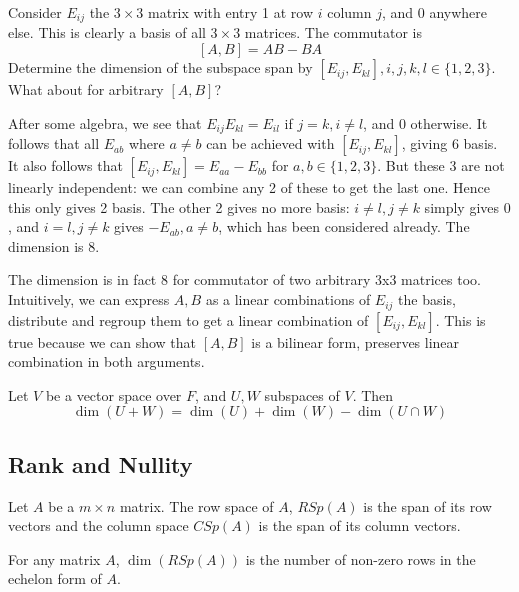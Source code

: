 \documentclass[11pt]{article}
\begin{document}
\begin{exercise}
  Consider \(E_{ij}\) the \(3\times 3\) matrix with entry 1 at row \(i\) column \(j\), and 0 anywhere else. This is clearly a basis of all \(3\times 3\) matrices. The commutator is
  \[[A,B]=AB-BA\]
  Determine the dimension of the subspace span by \([E_{ij},E_{kl}],i,j,k,l\in\{1,2,3\}\). What about for arbitrary \([A,B]\)?
\end{exercise}
\begin{solution}
  After some algebra, we see that \(E_{ij}E_{kl} = E_{il}\) if \(j=k, i\neq l\), and \(0\) otherwise. It follows that all \(E_{ab}\) where \(a\neq b\) can be achieved with \([E_{ij},E_{kl}]\), giving 6 basis. It also follows that \([E_{ij},E_{kl}]=E_{aa}-E_{bb}\) for \(a,b\in\{1,2,3\}\). But these 3 are not linearly independent: we can combine any 2 of these to get the last one. Hence this only gives 2 basis. The other 2 gives no more basis: \(i\neq l,j\neq k\) simply gives \(0\), and \(i=l,j\neq k\) gives \(-E_{ab},a\neq b\), which has been considered already. The dimension is 8.

  \vspace{5pt}The dimension is in fact 8 for commutator of two arbitrary 3x3 matrices too. Intuitively, we can express \(A,B\) as a linear combinations of \(E_{ij}\) the basis, distribute and regroup them to get a linear combination of \([E_{ij},E_{kl}]\). This is true because we can show that \([A,B]\) is a bilinear form, preserves linear combination in both arguments.
\end{solution}

\begin{theorem}
  Let \(V\) be a vector space over \(F\), and \(U,W\) subspaces of \(V\). Then
  \[\dim(U+W)=\dim(U)+\dim(W)-\dim(U\cap W)\]
\end{theorem}

\subsection{Rank and Nullity}
\begin{definition}
  Let \(A\) be a \(m\times n\) matrix. The row space of \(A\), \(RSp(A)\) is the span of its row vectors and the column space \(CSp(A)\) is the span of its column vectors.
\end{definition}

\begin{proposition}
  For any matrix \(A\), \(\dim(RSp(A))\) is the number of non-zero rows in the echelon form of \(A\). 
\end{proposition}
\end{document}
